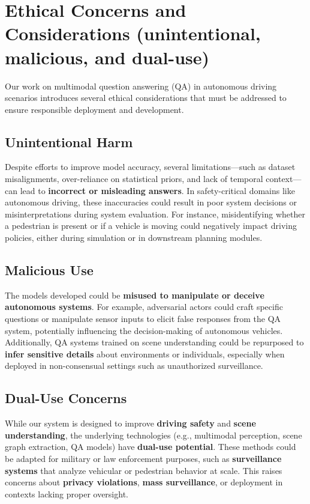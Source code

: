 \documentclass{article} %
\begin{document}
\section{ Ethical Concerns and Considerations (unintentional, malicious, and dual-use)}

Our work on multimodal question answering (QA) in autonomous driving scenarios introduces several ethical considerations that must be addressed to ensure responsible deployment and development.

\subsection*{Unintentional Harm}

Despite efforts to improve model accuracy, several limitations—such as dataset misalignments, over-reliance on statistical priors, and lack of temporal context—can lead to \textbf{incorrect or misleading answers}. In safety-critical domains like autonomous driving, these inaccuracies could result in poor system decisions or misinterpretations during system evaluation. For instance, misidentifying whether a pedestrian is present or if a vehicle is moving could negatively impact driving policies, either during simulation or in downstream planning modules.

\subsection*{Malicious Use}

The models developed could be \textbf{misused to manipulate or deceive autonomous systems}. For example, adversarial actors could craft specific questions or manipulate sensor inputs to elicit false responses from the QA system, potentially influencing the decision-making of autonomous vehicles. Additionally, QA systems trained on scene understanding could be repurposed to \textbf{infer sensitive details} about environments or individuals, especially when deployed in non-consensual settings such as unauthorized surveillance.

\subsection*{Dual-Use Concerns}

While our system is designed to improve \textbf{driving safety} and \textbf{scene understanding}, the underlying technologies (e.g., multimodal perception, scene graph extraction, QA models) have \textbf{dual-use potential}. These methods could be adapted for military or law enforcement purposes, such as \textbf{surveillance systems} that analyze vehicular or pedestrian behavior at scale. This raises concerns about \textbf{privacy violations}, \textbf{mass surveillance}, or deployment in contexts lacking proper oversight.
\end{document}
